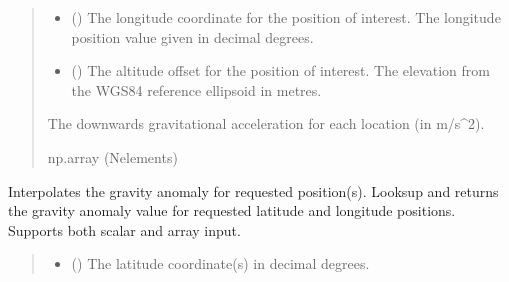 \documentclass[letterpaper,10pt,english]{sphinxmanual}
\begin{document}
\begin{fulllineitems}
\begin{fulllineitems}
\begin{quote}
\begin{description}
\begin{itemize}
\item {} 
\sphinxAtStartPar
{} () \textendash{} The longitude coordinate for the position of interest.
The longitude position value given in decimal degrees.

\item {} 
\sphinxAtStartPar
{} () \textendash{} The altitude offset for the position of interest.
The elevation from the WGS\sphinxhyphen{}84 reference ellipsoid in metres.

\end{itemize}

\sphinxAtStartPar
The downwards gravitational acceleration for each location
(in m/s\textasciicircum{}2).

\sphinxAtStartPar
np.array (N\sphinxhyphen{}elements)

\end{description}\end{quote}

\end{fulllineitems}


\begin{fulllineitems}
\label{\detokenize{modules/gravity/marine:qnav.gravity.marine.MarineGravity.get_map_value}}
\pysigstartsignatures
{}
\pysigstopsignatures
\sphinxAtStartPar
Interpolates the gravity anomaly for requested position(s).
Looks\sphinxhyphen{}up and returns the gravity anomaly value for requested latitude
and longitude positions. Supports both scalar and array input.
\begin{quote}\begin{description}
\begin{itemize}
\item {} 
\sphinxAtStartPar
{} (\sphinxstyleliteralemphasis{\sphinxupquote{ | }}) \textendash{} The latitude coordinate(s) in decimal degrees.


\end{itemize}
\end{description}
\end{quote}
\end{fulllineitems}
\end{fulllineitems}
\end{document}
